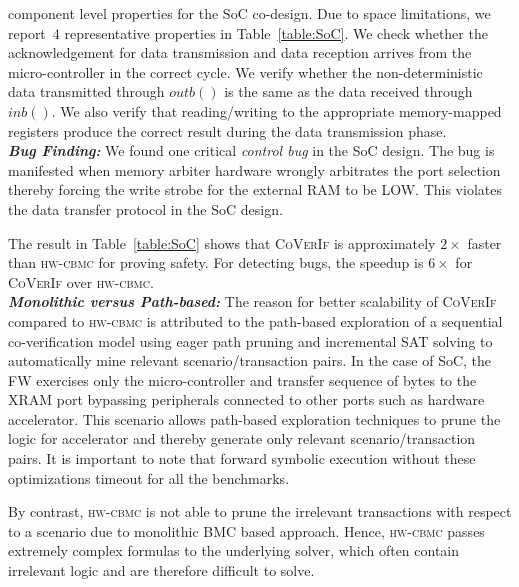 \documentclass[sigconf]{acmart}
\newcommand{\tool}[1]{\textsc{#1}\xspace}
\newcommand{\hwcbmcv}{\tool{hw-cbmc}}
\newcommand{\verifox}{\tool{CoVerIf}}
\begin{document}
component level properties for the SoC co-design.  Due to space 
limitations, we report~4 representative properties in Table~\ref{table:SoC}.  
We check whether the acknowledgement for data transmission and data reception arrives
from the micro-controller in the correct cycle.  We verify whether the
non-deterministic data transmitted through $outb()$ is the same as 
the data received through $inb()$.  We also verify that
reading/writing to the appropriate memory-mapped registers produce the
correct result during the data transmission phase.\\ 
\textbf{\emph{Bug Finding:}} We found one critical \emph{control bug} 
in the SoC design.  The bug is manifested when memory arbiter hardware 
wrongly arbitrates the port selection thereby forcing the write strobe 
for the external RAM to be LOW.  This violates the data transfer protocol 
in the SoC design.

The result in Table~\ref{table:SoC} shows that \verifox is approximately
$2\times$ faster than \hwcbmcv for proving safety.  For detecting bugs, 
the speedup is $6\times$ for \verifox over \hwcbmcv. \\ 
\textbf{\emph{Monolithic versus Path-based:}}
The reason for better scalability of \verifox compared to 
\hwcbmcv is attributed to the path-based exploration of a 
sequential co-verification model using eager path pruning and 
incremental SAT solving to automatically mine relevant scenario/transaction
pairs.  In the case of SoC, the FW exercises only the micro-controller 
and transfer sequence of bytes to the XRAM port bypassing peripherals 
connected to other ports such as hardware accelerator.  
This scenario allows path-based exploration techniques to prune the logic for
accelerator and thereby generate only relevant scenario/transaction pairs.  It 
is important to note that forward symbolic execution without these optimizations 
timeout for all the benchmarks.

By contrast, \hwcbmcv is not able to prune the irrelevant transactions with
respect to a scenario due to monolithic BMC based approach.  Hence, \hwcbmcv
passes extremely complex formulas to the underlying solver, which often
contain irrelevant logic and are therefore difficult to solve.

\end{document}
